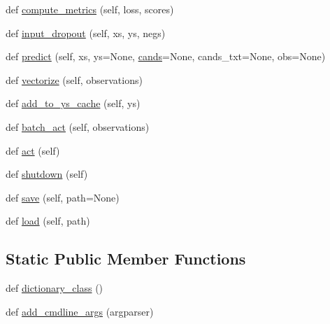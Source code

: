 \begin{DoxyCompactItemize}
def \hyperlink{classparlai_1_1agents_1_1starspace_1_1starspace_1_1StarspaceAgent_a69d9fa941c82271637287a44fde88cb3}{compute\+\_\+metrics} (self, loss, scores)
\item 
def \hyperlink{classparlai_1_1agents_1_1starspace_1_1starspace_1_1StarspaceAgent_a6511fc8a4d2687cd99a981b4e3b6a589}{input\+\_\+dropout} (self, xs, ys, negs)
\item 
def \hyperlink{classparlai_1_1agents_1_1starspace_1_1starspace_1_1StarspaceAgent_a16753fa083c07bcdb8164116d8288b39}{predict} (self, xs, ys=None, \hyperlink{classparlai_1_1agents_1_1starspace_1_1starspace_1_1StarspaceAgent_a1986fb638717b81936ada2bf418b259f}{cands}=None, cands\+\_\+txt=None, obs=None)
\item 
def \hyperlink{classparlai_1_1agents_1_1starspace_1_1starspace_1_1StarspaceAgent_a87253cca09c8b22848ff0bea7195e32d}{vectorize} (self, observations)
\item 
def \hyperlink{classparlai_1_1agents_1_1starspace_1_1starspace_1_1StarspaceAgent_ace15d00770ddf83193ddee499c7c87a1}{add\+\_\+to\+\_\+ys\+\_\+cache} (self, ys)
\item 
def \hyperlink{classparlai_1_1agents_1_1starspace_1_1starspace_1_1StarspaceAgent_a426f2fb245c6a0a409365c4662aec2d2}{batch\+\_\+act} (self, observations)
\item 
def \hyperlink{classparlai_1_1agents_1_1starspace_1_1starspace_1_1StarspaceAgent_aff87fb1b28e798a9ca28a0dc3fbb2f22}{act} (self)
\item 
def \hyperlink{classparlai_1_1agents_1_1starspace_1_1starspace_1_1StarspaceAgent_a4016a83cf0ed9ed97c8b94d9eacbcae3}{shutdown} (self)
\item 
def \hyperlink{classparlai_1_1agents_1_1starspace_1_1starspace_1_1StarspaceAgent_a55b3dab4e31cee40441105efb66004ac}{save} (self, path=None)
\item 
def \hyperlink{classparlai_1_1agents_1_1starspace_1_1starspace_1_1StarspaceAgent_a57f2fcd5e04246f3d8edf57ccdb99eab}{load} (self, path)
\end{DoxyCompactItemize}
\subsection*{Static Public Member Functions}
\begin{DoxyCompactItemize}
\item 
def \hyperlink{classparlai_1_1agents_1_1starspace_1_1starspace_1_1StarspaceAgent_a04d4db961ea8e3ed0ca1cb4cc7a7eca5}{dictionary\+\_\+class} ()
\item 
def \hyperlink{classparlai_1_1agents_1_1starspace_1_1starspace_1_1StarspaceAgent_ace1f02a93ef83c9623ab599f9be26d66}{add\+\_\+cmdline\+\_\+args} (argparser)
\end{DoxyCompactItemize}
